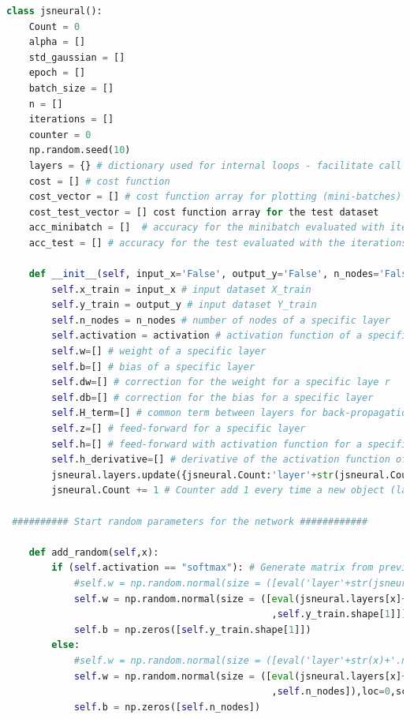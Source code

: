 \documentclass{article}
\begin{document}
\begin{lstlisting}[language=Python]
class jsneural():
    Count = 0 
    alpha = [] 
    std_gaussian = []
    epoch = []
    batch_size = []
    n = []
    iterations = []
    counter = 0
    np.random.seed(10)
    layers = {} # dictionary used for internal loops - facilitate call of attributes from layers
    cost = [] # cost function
    cost_vector = [] # cost function array for plotting (mini-batches)
    cost_test_vector = [] cost function array for the test dataset
    acc_minibatch = []  # accuracy for the minibatch evaluated with iterations
    acc_test = [] # accuracy for the test evaluated with the iterations
    
    def __init__(self, input_x='False', output_y='False', n_nodes='False', activation='False'): # initalization of attributes
        self.x_train = input_x # input dataset X_train
        self.y_train = output_y # input dataset Y_train
        self.n_nodes = n_nodes # number of nodes of a specific layer
        self.activation = activation # activation function of a specific layer 
        self.w=[] # weight of a specific layer
        self.b=[] # bias of a specific layer
        self.dw=[] # correction for the weight for a specific laye r
        self.db=[] # correction for the bias for a specific layer
        self.H_term=[] # common term between layers for back-propagation
        self.z=[] # feed-forward for a specific layer
        self.h=[] # feed-forward with activation function for a specific layer
        self.h_derivative=[] # derivative of the activation function of a specific layer
        jsneural.layers.update({jsneural.Count:'layer'+str(jsneural.Count)}) # Create dictionary for each layer
        jsneural.Count += 1 # Counter add 1 every time a new object (layer) is defined
        
 ########## Start random parameters for the network ############

    def add_random(self,x):
        if (self.activation == "softmax"): # Generate matrix from previous layer (n_nodes)
            #self.w = np.random.normal(size = ([eval('layer'+str(jsneural.Count-2)+'.n_nodes'),self.y_train.shape[1]]),loc=0,scale=jsneural.std_gaussian) 
            self.w = np.random.normal(size = ([eval(jsneural.layers[x]+'.n_nodes')
                                               ,self.y_train.shape[1]]),loc=0,scale=jsneural.std_gaussian) 
            self.b = np.zeros([self.y_train.shape[1]])
        else:
            #self.w = np.random.normal(size = ([eval('layer'+str(x)+'.n_nodes'),self.n_nodes]),loc=0,scale=jsneural.std_gaussian) 
            self.w = np.random.normal(size = ([eval(jsneural.layers[x]+'.n_nodes')
                                               ,self.n_nodes]),loc=0,scale=jsneural.std_gaussian) 
            self.b = np.zeros([self.n_nodes])
  

\end{lstlisting}
\end{document}
